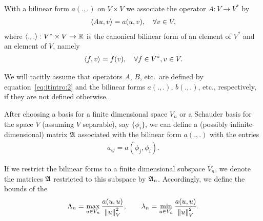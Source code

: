 \begin{notation}
  With a bilinear form $a(.,.)$ on $V\times V$ we associate the
  operator $A: V\to V^*$ by
  \begin{gather}
    \label{eq:itintro:2}
    \scal(Au,v) = a(u,v), \quad \forall v\in V,
  \end{gather}
  where $\scal(.,.):V^*\times V \to \R$ is the canonical bilinear form of an
  element of $V^*$ and an element of $V$, namely
  \begin{gather}
    \label{eq:richardson:9}
    \scal(f,v) = f(v), \quad \forall f\in V^*, v\in V.
  \end{gather}
  
  We will tacitly assume that operators $A$, $B$, etc.\ are defined by
  equation~\eqref{eq:itintro:2} and the bilinear forms $a(.,.)$,
  $b(.,.)$, etc., respectively, if they are not defined otherwise.
  
  After choosing a basis for a finite dimensional space $V_n$ or a
  Schauder basis for the space $V$ (assuming $V$ separable), say
  $\{\phi_i\}$, we can define a (possibly infinite-dimensional) matrix
  $\mathfrak{A}$ associated with the bilinear form $a(.,.)$ with the entries
  \begin{gather*}
    a_{i j} = a(\phi_j, \phi_i).
  \end{gather*}
  
  If we restrict the bilinear forms to a finite dimensional subspace
  $V_n$, we denote the matrices $\mathfrak{A}$ restricted to this subspace
  by $\mathfrak{A}_n$. Accordingly, we define the bounds of the
  \begin{gather}
    \label{eq:richardson:8}
    \Lambda_n = \max_{u\in V_n}\frac{a(u,u)}{\left\|u\right\|_V^2},
    \qquad
    \lambda_n = \min_{u\in V_n}\frac{a(u,u)}{\left\|u\right\|_V^2}.
  \end{gather}
\end{notation}

